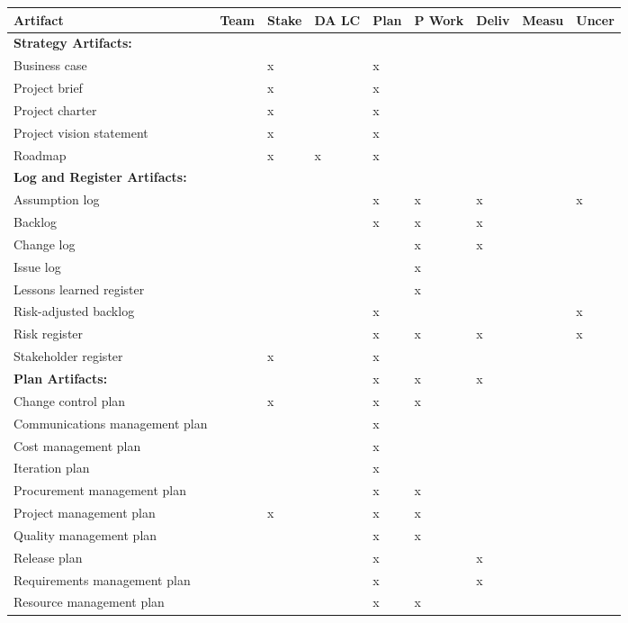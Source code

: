 \documentclass[11pt]{article}
\begin{document}
\label{artifacts_mapping}
\begin{center}
\begin{tabular}{lllllllll}
Artifact & Team\footnotemark & Stake\footnotemark & DA LC \footnotemark & Plan\footnotemark & P Work\footnotemark & Deliv\footnotemark & Measu\footnotemark & Uncer\footnotemark\\
\hline
\textbf{Strategy Artifacts:} &  &  &  &  &  &  &  & \\
\hline
Business case &  & x &  & x &  &  &  & \\
Project brief &  & x &  & x &  &  &  & \\
Project charter &  & x &  & x &  &  &  & \\
Project vision statement &  & x &  & x &  &  &  & \\
Roadmap &  & x & x & x &  &  &  & \\
\textbf{Log and Register Artifacts:} &  &  &  &  &  &  &  & \\
Assumption log &  &  &  & x & x & x &  & x\\
Backlog &  &  &  & x & x & x &  & \\
Change log &  &  &  &  & x & x &  & \\
Issue log &  &  &  &  & x &  &  & \\
Lessons learned register &  &  &  &  & x &  &  & \\
Risk-adjusted backlog &  &  &  & x &  &  &  & x\\
Risk register &  &  &  & x & x & x &  & x\\
Stakeholder register &  & x &  & x &  &  &  & \\
\hline
\textbf{Plan Artifacts:} &  &  &  & x & x & x &  & \\
\hline
Change control plan &  & x &  & x & x &  &  & \\
Communications management plan &  &  &  & x &  &  &  & \\
Cost management plan &  &  &  & x &  &  &  & \\
Iteration plan &  &  &  & x &  &  &  & \\
Procurement management plan &  &  &  & x & x &  &  & \\
Project management plan &  & x &  & x & x &  &  & \\
Quality management plan &  &  &  & x & x &  &  & \\
Release plan &  &  &  & x &  & x &  & \\
Requirements management plan &  &  &  & x &  & x &  & \\
Resource management plan &  &  &  & x & x &  &  & \\

\end{tabular}
\end{center}
\end{document}
